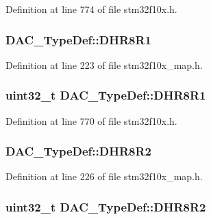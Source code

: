 Definition at line 774 of file stm32f10x.\+h.

\subsubsection[{\texorpdfstring{D\+H\+R8\+R1}{DHR8R1}}]{ D\+A\+C\+\_\+\+Type\+Def\+::\+D\+H\+R8\+R1}\hypertarget{struct_d_a_c___type_def_a8e931bca2083a7d83bf842f0b068feee}{}\label{struct_d_a_c___type_def_a8e931bca2083a7d83bf842f0b068feee}


Definition at line 223 of file stm32f10x\+\_\+map.\+h.

\subsubsection[{\texorpdfstring{D\+H\+R8\+R1}{DHR8R1}}]{ {\bf uint32\+\_\+t} D\+A\+C\+\_\+\+Type\+Def\+::\+D\+H\+R8\+R1}\hypertarget{struct_d_a_c___type_def_a3a382d341fb608a04390bacb8c00b0f0}{}\label{struct_d_a_c___type_def_a3a382d341fb608a04390bacb8c00b0f0}


Definition at line 770 of file stm32f10x.\+h.

\subsubsection[{\texorpdfstring{D\+H\+R8\+R2}{DHR8R2}}]{ D\+A\+C\+\_\+\+Type\+Def\+::\+D\+H\+R8\+R2}\hypertarget{struct_d_a_c___type_def_a260b8ddafeb6142995d88612dc9b33e5}{}\label{struct_d_a_c___type_def_a260b8ddafeb6142995d88612dc9b33e5}


Definition at line 226 of file stm32f10x\+\_\+map.\+h.

\subsubsection[{\texorpdfstring{D\+H\+R8\+R2}{DHR8R2}}]{ {\bf uint32\+\_\+t} D\+A\+C\+\_\+\+Type\+Def\+::\+D\+H\+R8\+R2}\hypertarget{struct_d_a_c___type_def_a3b096b71656f8fb32cd18b4c8b1d2334}{}\label{struct_d_a_c___type_def_a3b096b71656f8fb32cd18b4c8b1d2334}


